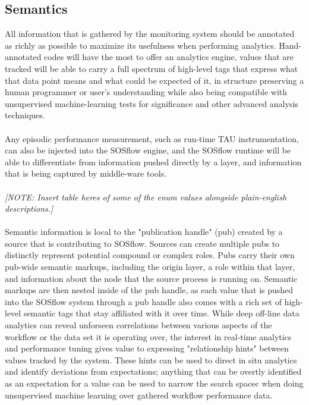 \documentclass[10pt, conference, compsocconf]{IEEEtran}
\begin{document}
\subsection{Semantics}
All information that is gathered by the monitoring system should be annotated 
as richly as possible to maximize its usefulness when performing analytics. 
Hand-annotated codes will have the most to offer an analytics engine,  
values that are tracked will be able to carry a full spectrum of high-level 
tags that express what that data point means and what could be expected of it, 
in structure preserving a human programmer or user's understanding while also
being compatible with unsupervised machine-learning tests for significance and 
other advanced analysis techniques.\\
\\
Any episodic performance measurement, such as run-time TAU instrumentation, can 
also be injected into the SOSflow engine, and the SOSflow runtime will be able to 
differentiate from information pushed directly by a layer, and information that 
is being captured by middle-ware tools.\\
\\
\textit{[NOTE: Insert table heres of some of the enum values alongside 
plain-english descriptions.]}\\
\\
Semantic information is local to the "publication handle" (pub) 
created by a source that is contributing to SOSflow.  Sources can create 
multiple pubs to distinctly represent potential compound or complex roles. Pubs 
carry their own pub-wide semantic markups, including 
the origin layer, a role within that layer, and information 
about the node that the source process is running on. Semantic markups are then 
nested inside of the pub handle, as each value that is pushed 
into the SOSflow system through a pub handle also comes with a rich set of 
high-level semantic tags that stay affiliated with it over time. While deep 
off-line data analytics 
can reveal unforseen correlations between various aspects of the workflow or the 
data set it is operating over, the interest in real-time analytics and 
performance tuning gives value to expressing "relationship hints" between 
values tracked by the system. These hints can be used to direct in situ 
analytics and identify deviations from expectations; anything that can be 
overtly identified as an expectation for a value can be used to narrow the 
search spacec when doing unsupervised machine learning over gathered workflow 
performance data.
\end{document}
